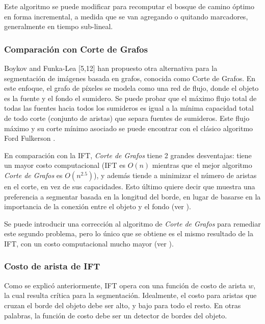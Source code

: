 \documentclass[a4paper,10pt]{article}
\begin{document}
Este algoritmo se puede modificar para recomputar el bosque de camino óptimo
en forma incremental, a medida que se van agregando o quitando marcadores,
generalmente en tiempo sub-lineal.

\subsubsection{Comparación con Corte de Grafos}

Boykov and Funka-Lea [5,12] han propuesto otra alternativa para la segmentación
de imágenes basada en grafos, conocida como Corte de Grafos.
En este enfoque, el grafo de píxeles se modela como una red de flujo,
donde el objeto es la fuente y el fondo el sumidero. Se puede probar que el máximo flujo total de todas las fuentes
hacia todos los sumideros es igual a la mínima capacidad total de todo corte
(conjunto de aristas) que separa fuentes de sumideros. Este flujo máximo y su
corte mínimo asociado se puede encontrar con el clásico algoritmo
Ford Fulkerson \cite{Cormen:2009:IAT:1614191}.

En comparación con la IFT, \textit{Corte de Grafos} tiene 2 grandes desventajas:
tiene un mayor costo computacional (IFT es $O(n)$ mientras que
el mejor algoritmo \textit{Corte de Grafos} es $O(n^{2.5})$), y además tiende a
minimizar el número de aristas en el corte, en vez de sus capacidades. Esto
último quiere decir que muestra una preferencia a segmentar basada en la
longitud del borde, en lugar de basarse en la importancia de la conexión
entre el objeto y el fondo (ver \cite{journals/jmiv/MirandaF09}).

Se puede introducir una corrección al algoritmo de \textit{Corte de Grafos} para
remediar este segundo problema, pero lo único que se obtiene es el mismo
resultado de la IFT, con un costo computacional mucho mayor (ver \cite{journals/jmiv/MirandaF09}).

\subsubsection{Costo de arista de IFT}

Como se explicó anteriormente, IFT opera con una función de costo de arista
$w$, la cual resulta crítica para la segmentación. Idealmente, el costo
para aristas que cruzan el borde del objeto debe ser alto, y bajo para todo
el resto. En otras palabras, la función de costo debe ser un detector
de bordes del objeto.
\end{document}
